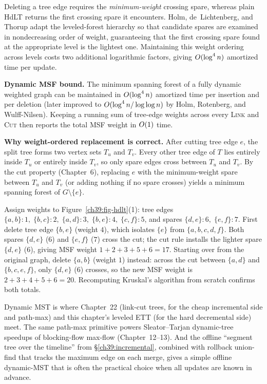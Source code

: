 Deleting a tree edge requires the \emph{minimum-weight} crossing spare, whereas plain
HdLT returns the first crossing spare it encounters. Holm, de~Lichtenberg, and Thorup
adapt the leveled-forest hierarchy so that candidate spares are examined in
nondecreasing order of weight, guaranteeing that the first crossing spare found at the
appropriate level is the lightest one. Maintaining this weight ordering across levels
costs two additional logarithmic factors, giving $O(\log^4 n)$ amortized time per
update.

\begin{focusbox}
\textbf{Dynamic MSF bound.} The minimum spanning forest of a fully dynamic weighted
graph can be maintained in $O(\log^4 n)$ amortized time per insertion and per
deletion (later improved to $O(\log^4 n/\log\log n)$ by Holm, Rotenberg, and
Wulff-Nilsen). Keeping a running sum of tree-edge weights across every \textsc{Link}
and \textsc{Cut} then reports the total MSF weight in $O(1)$ time.
\end{focusbox}

\begin{whybox}
\textbf{Why weight-ordered replacement is correct.} After cutting tree edge $e$, the
split tree forms two vertex sets $T_u$ and $T_v$. Every other tree edge of $T$ lies
entirely inside $T_u$ or entirely inside $T_v$, so only spare edges cross between $T_u$
and $T_v$. By the cut property (Chapter~6), replacing $e$ with the minimum-weight spare
between $T_u$ and $T_v$ (or adding nothing if no spare crosses) yields a minimum
spanning forest of $G \setminus \{e\}$.
\end{whybox}

\begin{labbox}
Assign weights to Figure~\ref{ch39:fig-hdlt}(1): tree edges
$\{a,b\}:1,\; \{b,c\}:2,\; \{a,d\}:3,\; \{b,e\}:4,\; \{c,f\}:5$, and spares
$\{d,e\}:6,\; \{e,f\}:7$. First delete tree edge $\{b,e\}$ (weight $4$), which isolates
$\{e\}$ from $\{a,b,c,d,f\}$. Both spares $\{d,e\}$ ($6$) and $\{e,f\}$ ($7$) cross the
cut; the cut rule installs the lighter spare $\{d,e\}$ ($6$), giving MSF weight
$1+2+3+5+6=17$. Starting over from the original graph, delete $\{a,b\}$ (weight $1$)
instead: across the cut between $\{a,d\}$ and $\{b,c,e,f\}$, only $\{d,e\}$ ($6$)
crosses, so the new MSF weight is $2+3+4+5+6=20$. Recomputing Kruskal's algorithm from
scratch confirms both totals.
\end{labbox}

\begin{connectionbox}
Dynamic MST is where Chapter~22 (link-cut trees, for the cheap incremental side
and path-max) and this chapter's leveled ETT (for the hard decremental side) meet.
The same path-max primitive powers Sleator--Tarjan dynamic-tree speedups of
blocking-flow max-flow (Chapter~12--13). And the offline ``segment tree over the
timeline'' from \S\ref{ch39:incremental}, combined with rollback union-find that
tracks the maximum edge on each merge, gives a simple offline dynamic-MST that
is often the practical choice when all updates are known in advance.
\end{connectionbox}

